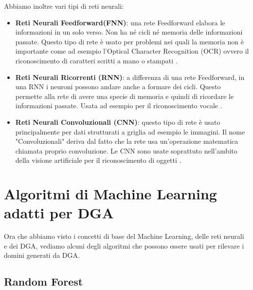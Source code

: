 \documentclass[12pt,a4paper,openright,twoside]{book}
\begin{document}
Abbiamo inoltre vari tipi di reti neurali:
\begin{itemize}
    \item \textbf{Reti Neurali Feedforward(FNN)}: una rete Feedforward
    elabora le informazioni in un solo verso. Non ha né cicli
    né memoria delle informazioni passate. Questo tipo di rete
    è usato per problemi nei quali la memoria non è importante
    come ad esempio l'Optical Character Recognition (OCR) ovvero il riconoscimento
    di caratteri scritti a mano o stampati \cite{feedforwardneural}.
    \item \textbf{Reti Neurali Ricorrenti (RNN)}:
    a differenza di una rete Feedforward, in una RNN 
    i neuroni possono andare anche a formare dei cicli. 
    Questo permette alla rete di avere una specie di memoria
    e quindi di ricordare le informazioni passate. Usata
    ad esempio per il riconoscimento vocale \cite{RNN}.
    \item \textbf{Reti Neurali Convoluzionali (CNN)}: questo tipo di rete
    è usato principalmente per dati strutturati a griglia ad esempio le immagini.
    Il nome "Convoluzionali" deriva dal fatto che la
    rete usa un'operazione matematica chiamata proprio
    convoluzione. Le CNN sono usate soprattuto nell'ambito della
    visione artificiale per il riconoscimento di oggetti
    \cite{Goodfellow-et-al-2016}.
\end{itemize}

\section{Algoritmi di Machine Learning adatti per DGA}

Ora che abbiamo visto i concetti di base del Machine Learning, delle reti neurali
e dei DGA, vediamo alcuni degli algoritmi che possono essere usati
per rilevare i domini generati da DGA.

\subsection{Random Forest}
\end{document}
